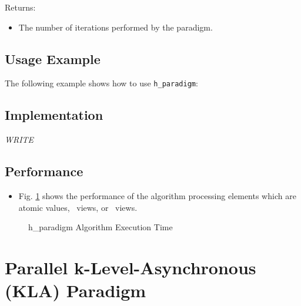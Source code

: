 Returns:
\begin{itemize}
\item
The number of iterations performed by the paradigm. 
\end{itemize}

\subsection{Usage Example} \label{sec-level-para-alg-use}

The following example shows how to use 
\texttt{h\_paradigm}:


\subsection{Implementation} \label{sec-level-para-alg-impl}

\textit{WRITE}

\subsection{Performance} \label{sec-level-para-alg-perf}

\begin{itemize}
\item
Fig. \ref{fig:level-para-alg-exec-exper}
shows the performance of the algorithm processing
elements which are atomic values, \stl\ views, or \stapl\ views.
\end{itemize}

\begin{figure}[p]
\caption{ h\_paradigm Algorithm Execution Time}
\label{fig:level-para-alg-exec-exper}
\end{figure}


\section{Parallel k-Level-Asynchronous (KLA) Paradigm}
\label{sec-kla-alg}


